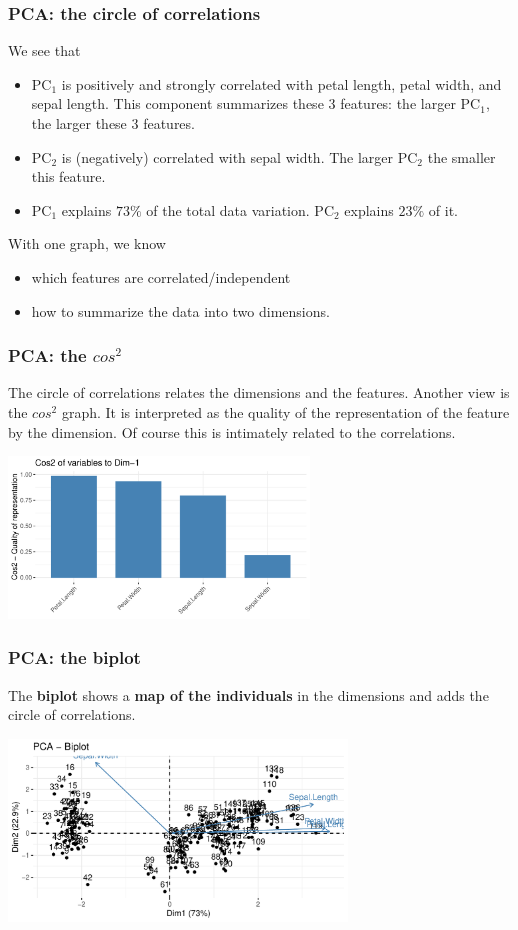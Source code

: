 \begin{frame}
\frametitle{PCA: the circle of correlations}
We see that
\begin{itemize}
\item PC$_1$ is positively and strongly correlated with petal length, petal width, and sepal length. This component summarizes these 3 features: the larger PC$_1$, the larger these 3 features.
\item PC$_2$ is (negatively) correlated with sepal width. The larger PC$_2$ the smaller this feature.
\item PC$_1$ explains $73\%$ of the total data variation. PC$_2$ explains $23\%$ of it.
\end{itemize}
With one graph, we know 
\begin{itemize}
\item which features are correlated/independent
\item how to summarize the data into two dimensions. 
\end{itemize}
\end{frame}
\begin{frame}
\frametitle{PCA: the $cos^2$}
The circle of correlations relates the dimensions and the features. Another view is the {\bf $cos^2$} graph. It is interpreted as the quality of the representation of the feature by the dimension. Of course this is intimately related to the correlations.
\begin{center}
\includegraphics[width=8cm]{../../Graphs/Iris_cos2.png}
\end{center}
\end{frame}
\begin{frame}
\frametitle{PCA: the biplot}
The {\bf biplot} shows a {\bf map of the individuals} in the dimensions and adds the circle of correlations. 
\begin{center}
\includegraphics[width=9cm]{../../Graphs/Iris_biplot.png}
\end{center}
\end{frame}
